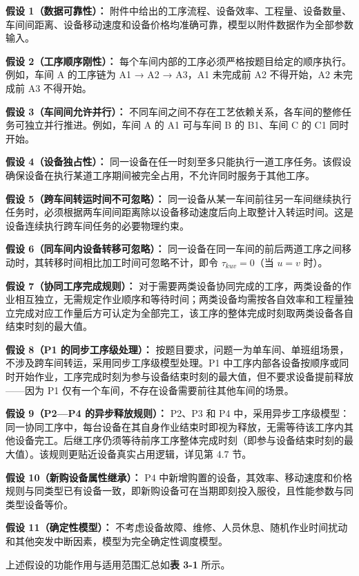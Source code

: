 \documentclass[UTF8,a4paper,12pt]{ctexart}
\begin{document}
\textbf{假设 1（数据可靠性）：} 附件中给出的工序流程、设备效率、工程量、设备数量、车间间距离、设备移动速度和设备价格均准确可靠，模型以附件数据作为全部参数输入。

\textbf{假设 2（工序顺序刚性）：} 每个车间内部的工序必须严格按题目给定的顺序执行。例如，车间 A 的工序链为 A1 → A2 → A3，A1 未完成前 A2 不得开始，A2 未完成前 A3 不得开始。

\textbf{假设 3（车间间允许并行）：} 不同车间之间不存在工艺依赖关系，各车间的整修任务可独立并行推进。例如，车间 A 的 A1 可与车间 B 的 B1、车间 C 的 C1 同时开始。

\textbf{假设 4（设备独占性）：} 同一设备在任一时刻至多只能执行一道工序任务。该假设确保设备在执行某道工序期间被完全占用，不允许同时服务于其他工序。

\textbf{假设 5（跨车间转运时间不可忽略）：} 同一设备从某一车间前往另一车间继续执行任务时，必须根据两车间间距离除以设备移动速度后向上取整计入转运时间。这是设备连续执行跨车间任务的必要物理约束。

\textbf{假设 6（同车间内设备转移可忽略）：} 同一设备在同一车间的前后两道工序之间移动时，其转移时间相比加工时间可忽略不计，即令 $\tau_{kuv} = 0$（当 $u = v$ 时）。

\textbf{假设 7（协同工序完成规则）：} 对于需要两类设备协同完成的工序，两类设备的作业相互独立，无需规定作业顺序和等待时间；两类设备均需按各自效率和工程量独立完成对应工作量后方可认定为全部完工，该工序的整体完成时刻取两类设备各自结束时刻的最大值。

\textbf{假设 8（P1 的同步工序级处理）：} 按题目要求，问题一为单车间、单班组场景，不涉及跨车间转运，采用同步工序级模型处理。P1 中工序内部各设备按顺序或同时开始作业，工序完成时刻为参与设备结束时刻的最大值，但不要求设备提前释放——因为 P1 仅有一个车间，不存在设备需要前往其他车间的场景。

\textbf{假设 9（P2—P4 的异步释放规则）：} P2、P3 和 P4 中，采用异步工序级模型：同一协同工序中，每台设备在其自身作业结束时即视为释放，无需等待该工序内其他设备完工。后继工序仍须等待前序工序整体完成时刻（即参与设备结束时刻的最大值）。该规则更贴近设备真实占用逻辑，详见第 4.7 节。

\textbf{假设 10（新购设备属性继承）：} P4 中新增购置的设备，其效率、移动速度和价格规则与同类型已有设备一致，即新购设备可在当期即刻投入服役，且性能参数与同类型设备等价。

\textbf{假设 11（确定性模型）：} 不考虑设备故障、维修、人员休息、随机作业时间扰动和其他突发中断因素，模型为完全确定性调度模型。

上述假设的功能作用与适用范围汇总如\textbf{表 3-1} 所示。
\end{document}
